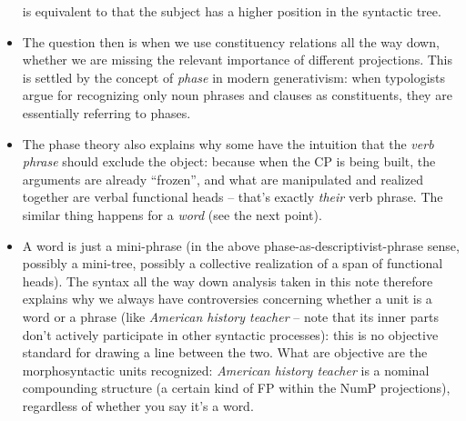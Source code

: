\documentclass[a4paper, oneside]{report}
\newcommand*{\term}[1]{\emph{#1}}
\newcommand{\corpus}[1]{\emph{#1}}
\begin{document}
\begin{itemize}
        is equivalent to that the subject has a higher position in the syntactic tree.
    \item The question then is when we use constituency relations all the way down, 
        whether we are missing the relevant importance of different projections. 
        This is settled by the concept of \emph{phase} in modern generativism:
        when typologists argue for recognizing only noun phrases and clauses as constituents, 
        they are essentially referring to phases. 
    \item The phase theory also explains why some have the intuition that 
        the \term{verb phrase} should exclude the object: 
        because when the CP is being built, 
        the arguments are already ``frozen'', 
        and what are manipulated and realized together 
        are verbal functional heads -- that's exactly \emph{their} verb phrase. 
        The similar thing happens for a \term{word} (see the next point). 
    \item A word is just a mini-phrase 
        (in the above phase-as-descriptivist-phrase sense, 
        possibly a mini-tree, possibly a collective realization of a span of functional heads).
        The syntax all the way down analysis taken in this note 
        therefore explains why we always have controversies 
        concerning whether a unit is a word or a phrase 
        (like \corpus{American history teacher} 
        -- note that its inner parts don't actively participate in other syntactic processes):
        this is no objective standard for drawing a line between the two. 
        What are objective are the morphosyntactic units recognized: 
        \corpus{American history teacher} is a nominal compounding structure 
        (a certain kind of FP within the NumP projections),
        regardless of whether you say it's a word. 


\end{itemize}
\end{document}
